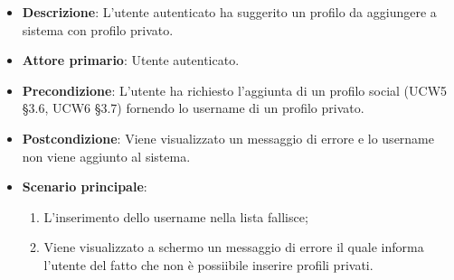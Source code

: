 \begin{itemize}
	\item \textbf{Descrizione}: L'utente autenticato ha suggerito un profilo da aggiungere a sistema con profilo privato.
    \item \textbf{Attore primario}: Utente autenticato.
    \item \textbf{Precondizione}: L’utente ha richiesto l’aggiunta di un profilo social (UCW5 §3.6, UCW6 §3.7) fornendo lo username di un profilo privato.
    \item \textbf{Postcondizione}: Viene visualizzato un messaggio di errore e lo username non viene aggiunto al sistema.
    \item \textbf{Scenario principale}: 
    \begin{enumerate}
        \item L'inserimento dello username nella lista fallisce;
        \item Viene visualizzato a schermo un messaggio di errore il quale informa l'utente del fatto che non è possiibile inserire profili privati.
    \end{enumerate}
\end{itemize}

